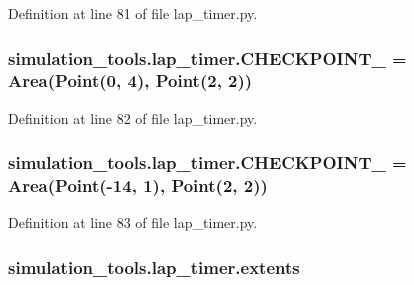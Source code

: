 Definition at line 81 of file lap\+\_\+timer.\+py.

\subsubsection[{\texorpdfstring{C\+H\+E\+C\+K\+P\+O\+I\+N\+T\+\_\+2}{CHECKPOINT_2}}]{\setlength{\rightskip}{0pt plus 5cm}simulation\+\_\+tools.\+lap\+\_\+timer.\+C\+H\+E\+C\+K\+P\+O\+I\+N\+T\+\_ = {\bf Area}({\bf Point}(0, 4), {\bf Point}(2, 2))}\hypertarget{namespacesimulation__tools_1_1lap__timer_a7773acfe8635b4d8a0e96d13912243b0}{}\label{namespacesimulation__tools_1_1lap__timer_a7773acfe8635b4d8a0e96d13912243b0}


Definition at line 82 of file lap\+\_\+timer.\+py.

\subsubsection[{\texorpdfstring{C\+H\+E\+C\+K\+P\+O\+I\+N\+T\+\_\+3}{CHECKPOINT_3}}]{\setlength{\rightskip}{0pt plus 5cm}simulation\+\_\+tools.\+lap\+\_\+timer.\+C\+H\+E\+C\+K\+P\+O\+I\+N\+T\+\_ = {\bf Area}({\bf Point}(-\/14, 1), {\bf Point}(2, 2))}\hypertarget{namespacesimulation__tools_1_1lap__timer_a197a8c1ba2497108f555aa4d1670ccd7}{}\label{namespacesimulation__tools_1_1lap__timer_a197a8c1ba2497108f555aa4d1670ccd7}


Definition at line 83 of file lap\+\_\+timer.\+py.

\subsubsection[{\texorpdfstring{extents}{extents}}]{\setlength{\rightskip}{0pt plus 5cm}simulation\+\_\+tools.\+lap\+\_\+timer.\+extents}\hypertarget{namespacesimulation__tools_1_1lap__timer_a18d52d051d6ebf35a4cee65e89a187d2}{}\label{namespacesimulation__tools_1_1lap__timer_a18d52d051d6ebf35a4cee65e89a187d2}


